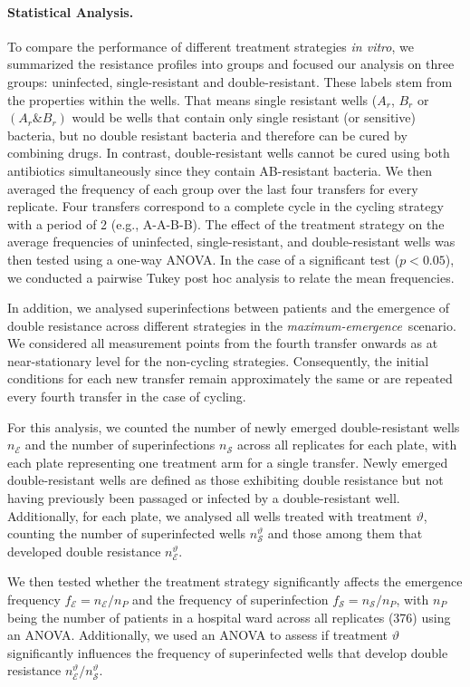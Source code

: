 \paragraph{Statistical Analysis. \label{ssec:statistics}}
To compare the performance of different treatment strategies \textit{in vitro}, we summarized the resistance profiles into groups and focused our analysis on three groups: uninfected, single-resistant and double-resistant.
These labels stem from the properties within the wells.
That means single resistant wells ($A_r$, $B_r$ or $(A_r\&B_r)$ would be wells that contain only single resistant (or sensitive) bacteria, but no double resistant bacteria and therefore can be cured by combining drugs.
In contrast, double-resistant wells cannot be cured using both antibiotics simultaneously since they contain AB-resistant bacteria.
We then averaged the frequency of each group over the last four transfers for every replicate.
Four transfers correspond to a complete cycle in the cycling strategy with a period of 2 (e.g., A-A-B-B).
The effect of the treatment strategy on the average frequencies of uninfected, single-resistant, and double-resistant wells was then tested using a one-way ANOVA.
In the case of a significant test ($p < 0.05$), we conducted a pairwise Tukey post hoc analysis to relate the mean frequencies.

In addition, we analysed superinfections between patients and the emergence of double resistance across different strategies in the \textit{maximum-emergence}~scenario.
We considered all measurement points from the fourth transfer onwards as at near-stationary level for the non-cycling strategies.
Consequently, the initial conditions for each new transfer remain approximately the same or are repeated every fourth transfer in the case of cycling.

For this analysis, we counted the number of newly emerged double-resistant wells \(n_{{\mathcal E}}\) and the number of superinfections \(n_{{\mathcal S}}\) across all replicates for each plate, with each plate representing one treatment arm for a single transfer.
Newly emerged double-resistant wells are defined as those exhibiting double resistance but not having previously been passaged or infected by a double-resistant well.
Additionally, for each plate, we analysed all wells treated with treatment \(\vartheta\), counting the number of superinfected wells \(n^{\vartheta}_{{\mathcal S}}\) and those among them that developed double resistance \(n^{\vartheta}_{{\mathcal E}}\).

We then tested whether the treatment strategy significantly affects the emergence frequency \(f_{\mathcal E } = n_{\mathcal E}/{n_P}\) and the frequency of superinfection \(f_{{\mathcal S}} = n_{{\mathcal S}}/{n_P}\), with \(n_P\) being the number of patients in a hospital ward across all replicates (376) using an ANOVA.
Additionally, we used an ANOVA to assess if treatment \(\vartheta\) significantly influences the frequency of superinfected wells that develop double resistance \(n^{\vartheta}_{{\mathcal E}}/{n^{\vartheta}_{{\mathcal S}}}\).

